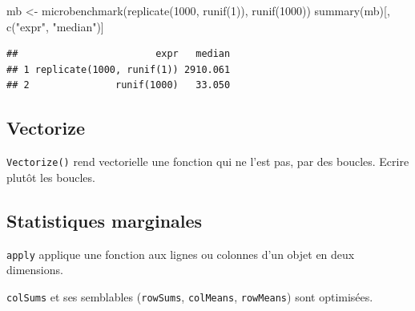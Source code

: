 \documentclass[
  11pt,
  french,
  a4paper,
  extrafontsizes,onecolumn,openright
  ]{memoir}
\newenvironment{Shaded}{\begin{snugshade}}{\end{snugshade}}
\newcommand{\DecValTok}[1]{\textcolor[rgb]{0.00,0.00,0.81}{#1}}
\newcommand{\FunctionTok}[1]{\textcolor[rgb]{0.00,0.00,0.00}{#1}}
\newcommand{\NormalTok}[1]{#1}
\newcommand{\OtherTok}[1]{\textcolor[rgb]{0.56,0.35,0.01}{#1}}
\newcommand{\StringTok}[1]{\textcolor[rgb]{0.31,0.60,0.02}{#1}}
\begin{document}
\scriptsize

\begin{Shaded}
\begin{Highlighting}[]
\NormalTok{mb }\OtherTok{\textless{}{-}} \FunctionTok{microbenchmark}\NormalTok{(}\FunctionTok{replicate}\NormalTok{(}\DecValTok{1000}\NormalTok{, }\FunctionTok{runif}\NormalTok{(}\DecValTok{1}\NormalTok{)), }\FunctionTok{runif}\NormalTok{(}\DecValTok{1000}\NormalTok{))}
\FunctionTok{summary}\NormalTok{(mb)[, }\FunctionTok{c}\NormalTok{(}\StringTok{"expr"}\NormalTok{, }\StringTok{"median"}\NormalTok{)]}
\end{Highlighting}
\end{Shaded}

\begin{verbatim}
##                        expr   median
## 1 replicate(1000, runif(1)) 2910.061
## 2               runif(1000)   33.050
\end{verbatim}

\normalsize

\hypertarget{vectorize}{%
\subsection{Vectorize}\label{vectorize}}

\texttt{Vectorize()} rend vectorielle une fonction qui ne l'est pas, par des boucles.
Ecrire plutôt les boucles.

\hypertarget{statistiques-marginales}{%
\subsection{Statistiques marginales}\label{statistiques-marginales}}

\texttt{apply} applique une fonction aux lignes ou colonnes d'un objet en deux dimensions.

\texttt{colSums} et ses semblables (\texttt{rowSums}, \texttt{colMeans}, \texttt{rowMeans}) sont optimisées.

\scriptsize
\end{document}
